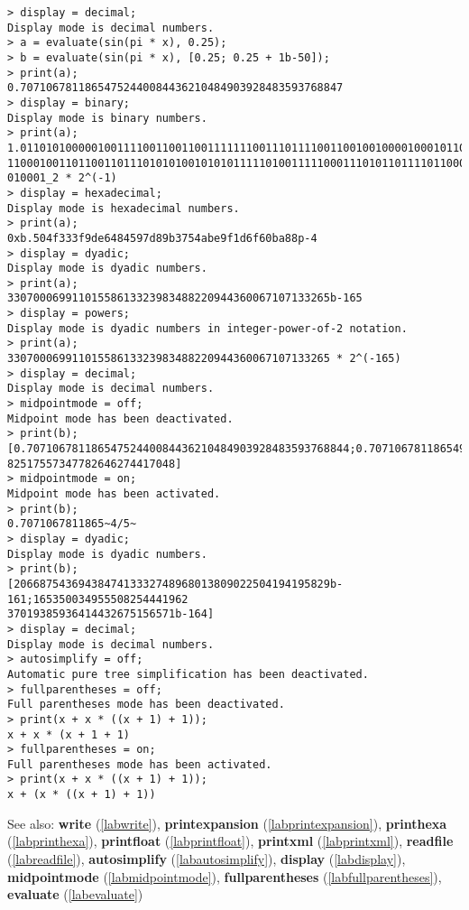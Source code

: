 \begin{center}\begin{minipage}{15cm}\begin{Verbatim}[frame=single]
> display = decimal;
Display mode is decimal numbers.
> a = evaluate(sin(pi * x), 0.25);
> b = evaluate(sin(pi * x), [0.25; 0.25 + 1b-50]);
> print(a);
0.70710678118654752440084436210484903928483593768847
> display = binary;
Display mode is binary numbers.
> print(a);
1.011010100000100111100110011001111111001110111100110010010000100010110010111110
11000100110110011011101010100101010111110100111110001110101101111011000001011101
010001_2 * 2^(-1)
> display = hexadecimal;
Display mode is hexadecimal numbers.
> print(a);
0xb.504f333f9de6484597d89b3754abe9f1d6f60ba88p-4
> display = dyadic;
Display mode is dyadic numbers.
> print(a);
33070006991101558613323983488220944360067107133265b-165
> display = powers;
Display mode is dyadic numbers in integer-power-of-2 notation.
> print(a);
33070006991101558613323983488220944360067107133265 * 2^(-165)
> display = decimal;
Display mode is decimal numbers.
> midpointmode = off;
Midpoint mode has been deactivated.
> print(b);
[0.70710678118654752440084436210484903928483593768844;0.707106781186549497437217
82517557347782646274417048]
> midpointmode = on;
Midpoint mode has been activated.
> print(b);
0.7071067811865~4/5~
> display = dyadic;
Display mode is dyadic numbers.
> print(b);
[2066875436943847413332748968013809022504194195829b-161;165350034955508254441962
37019385936414432675156571b-164]
> display = decimal;
Display mode is decimal numbers.
> autosimplify = off;
Automatic pure tree simplification has been deactivated.
> fullparentheses = off;
Full parentheses mode has been deactivated.
> print(x + x * ((x + 1) + 1));
x + x * (x + 1 + 1)
> fullparentheses = on;
Full parentheses mode has been activated.
> print(x + x * ((x + 1) + 1));
x + (x * ((x + 1) + 1))
\end{Verbatim}
\end{minipage}\end{center}
See also: \textbf{write} (\ref{labwrite}), \textbf{printexpansion} (\ref{labprintexpansion}), \textbf{printhexa} (\ref{labprinthexa}), \textbf{printfloat} (\ref{labprintfloat}), \textbf{printxml} (\ref{labprintxml}), \textbf{readfile} (\ref{labreadfile}), \textbf{autosimplify} (\ref{labautosimplify}), \textbf{display} (\ref{labdisplay}), \textbf{midpointmode} (\ref{labmidpointmode}), \textbf{fullparentheses} (\ref{labfullparentheses}), \textbf{evaluate} (\ref{labevaluate})
